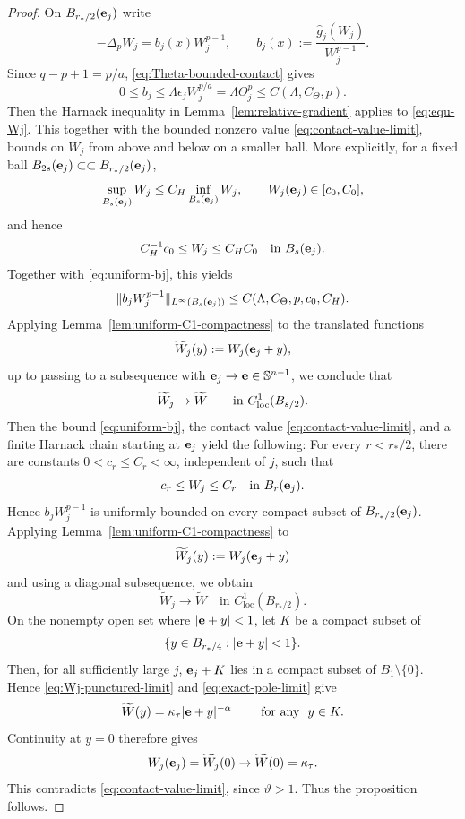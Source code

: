\documentclass[reqno,12pt]{amsart}
\numberwithin{equation}{section}
\theoremstyle{remark}
\newcommand{\loc}{\mathrm{loc}}
\begin{document}
\begin{proof}
\medskip
{}
On $B_{r_*/2}({\bf e}_j)$ write
\begin{equation}\label{eq:equ-Wj}
-\Delta_pW_j=b_j(x)W_j^{p-1}, \qquad b_j(x):=\frac{\widehat g_j(W_j)}{W_j^{p-1}}.
\end{equation}
Since $q-p+1=p/a$, \eqref{eq:Theta-bounded-contact} gives
\begin{equation}\label{eq:uniform-bj}
    0\le b_j\le\Lambda\epsilon_jW_j^{p/a}
=\Lambda\Theta_j^p\le C(\Lambda,C_{\Theta}, p).
\end{equation}
Then the Harnack inequality in
Lemma~\ref{lem:relative-gradient} applies to
\eqref{eq:equ-Wj}. This together with the bounded nonzero value \eqref{eq:contact-value-limit}, bounds on $W_j$ from above and below on a smaller ball.  More explicitly, for a fixed ball $B_{2s}({\bf e}_j)\subset\subset B_{r_*/2}({\bf e}_j)$,
$$
\sup_{B_s({\bf e}_j)}W_j\le C_H\inf_{B_s({\bf e}_j)}W_j,
\qquad
W_j({\bf e}_j)\in[c_0,C_0],
$$
and hence
$$
C_H^{-1}c_0\le W_j\le C_HC_0
\quad\text{in }B_s({\bf e}_j).
$$
Together with \eqref{eq:uniform-bj}, this yields
$$
\|b_jW_j^{p-1}\|_{L^\infty(B_s({\bf e}_j))}\le C(\Lambda,C_{\Theta}, p,c_0,C_H).
$$
Applying Lemma~\ref{lem:uniform-C1-compactness} to the translated functions
$$
\widetilde W_j(y):=W_j({\bf e}_j+y),
$$
up to passing to a subsequence with ${\bf e}_j\to{\bf e}\in \mathbb S^{n-1}$, we conclude that
$$
\widetilde W_j\to\widetilde W
\qquad\text{in }C^1_{\rm loc}(B_{s/2}).
$$ 
Then the bound \eqref{eq:uniform-bj}, the contact value
\eqref{eq:contact-value-limit}, and a finite Harnack chain starting at ${\bf e}_j$ yield the following: For every $r<r_*/2$, there are constants $0<c_r\le C_r<\infty$, independent of $j$, such that
$$
c_r\le W_j\le C_r \quad\text{in }B_r({\bf e}_j).
$$
Hence $b_jW_j^{p-1}$ is uniformly bounded on every compact subset of
$B_{r_*/2}({\bf e}_j)$. Applying
Lemma~\ref{lem:uniform-C1-compactness} to
$$
\widetilde W_j(y):=W_j({\bf e}_j+y)
$$
and using a diagonal subsequence, we obtain
$$
\widetilde W_j\to\widetilde W
\quad\text{in }C^1_{\loc}(B_{r_*/2}).
$$
On the nonempty open set where $|{\bf e}+y|<1$, let $K$ be a compact subset of
$$
\{y\in B_{r_*/4}:|{\bf e}+y|<1\}.
$$
Then, for all sufficiently large $j$, ${\bf e}_j+K$ lies in a compact subset of $B_1\setminus\{0\}$.  Hence
\eqref{eq:Wj-punctured-limit} and \eqref{eq:exact-pole-limit} give
$$
\widetilde W(y) =\kappa_\tau|{\bf e}+y|^{-\alpha} \qquad \text{ for any }\ y\in K.
$$
Continuity at $y=0$ therefore gives
$$
W_j({\bf e}_j)=\widetilde W_j(0) \to \widetilde W(0)=\kappa_\tau.
$$
This contradicts \eqref{eq:contact-value-limit}, since
$\vartheta>1$.  Thus the proposition follows.
\end{proof}
\end{document}
